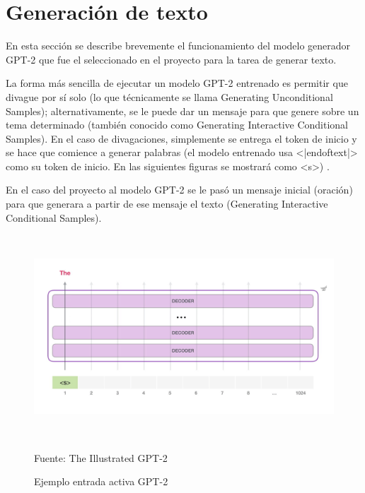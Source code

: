 \documentclass[../Main.tex]{subfiles}
\begin{document}
    \section{Generación de texto}
    
    \begin{justify}
    En esta sección se describe brevemente el funcionamiento del modelo generador GPT-2 que fue el seleccionado en el proyecto para la tarea de generar texto.
    
    La forma más sencilla de ejecutar un modelo GPT-2 entrenado es permitir que divague por sí solo (lo que técnicamente se llama Generating Unconditional Samples); alternativamente, se le puede dar un mensaje para que genere sobre un tema determinado (también conocido como Generating Interactive Conditional Samples). En el caso de divagaciones, simplemente se entrega el token de inicio y se hace que comience a generar palabras (el modelo entrenado usa <|endoftext|> como su token de inicio. En las siguientes figuras se mostrará como <s>) \cite{46}. %
    
    En el caso del proyecto al modelo GPT-2 se le pasó un mensaje inicial (oración) para que generara a partir de ese mensaje el texto (Generating Interactive Conditional Samples).
    \end{justify}
    
    \begin{figure}[H]
	\begin{Center}
		\includegraphics[width=6in,height=3in]{Chapters/04ChapterModelamiento/images/gpt-2-layers-input-1.png}
	    \caption{Ejemplo entrada activa GPT-2}
	    Fuente: The Illustrated GPT-2 \cite{46}
        \label{fig:section}
	\end{Center}
    \end{figure}
    
\end{document}
